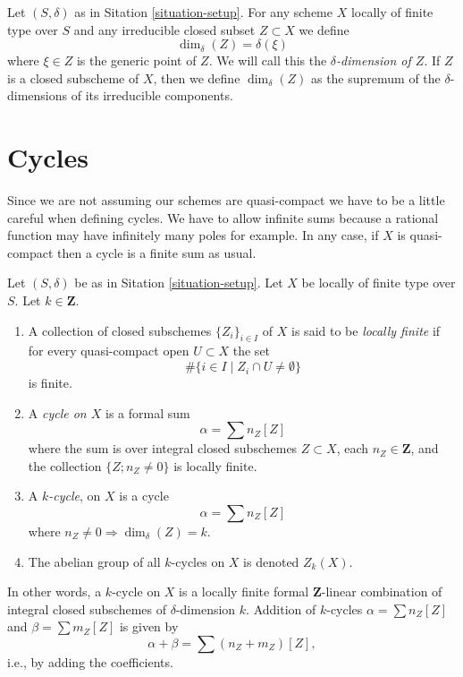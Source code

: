 \begin{definition}
\label{definition-delta-dimension}
Let $(S, \delta)$ as in Sitation \ref{situation-setup}.
For any scheme $X$ locally of finite type over $S$
and any irreducible closed subset $Z \subset X$ we define
$$
\dim_\delta(Z) = \delta(\xi)
$$
where $\xi \in Z$ is the generic point of $Z$.
We will call this the {\it $\delta$-dimension of $Z$}.
If $Z$ is a closed subscheme of $X$, then we define
$\dim_\delta(Z)$ as the supremum of the $\delta$-dimensions
of its irreducible components.
\end{definition}







\section{Cycles}
\label{section-cycles}

\noindent
Since we are not assuming our schemes are quasi-compact we have
to be a little careful when defining cycles. We have to allow
infinite sums because a rational function may have infinitely many
poles for example. In any case, if $X$ is quasi-compact then a
cycle is a finite sum as usual.

\begin{definition}
\label{definition-cycles}
Let $(S, \delta)$ be as in Sitation \ref{situation-setup}.
Let $X$ be locally of finite type over $S$.
Let $k \in \mathbf{Z}$.
\begin{enumerate}
\item A collection of closed subschemes $\{Z_i\}_{i \in I}$ of $X$
is said to be {\it locally finite} if for every quasi-compact open
$U \subset X$ the set
$$
\# \{i\in I \mid Z_i \cap U \not = \emptyset\}
$$
is finite.
\item A {\it cycle on $X$} is a formal sum
$$
\alpha = \sum n_Z [Z]
$$
where the sum is over integral closed subschemes $Z \subset X$,
each $n_Z \in \mathbf{Z}$, and the collection
$\{Z; n_Z \not = 0\}$ is locally finite.
\item A {\it $k$-cycle}, on $X$ is
a cycle
$$
\alpha = \sum n_Z [Z]
$$
where $n_Z \not = 0 \Rightarrow \dim_\delta(Z) = k$.
\item The abelian group of all $k$-cycles on $X$ is denoted $Z_k(X)$.
\end{enumerate}
\end{definition}

\noindent
In other words, a $k$-cycle on $X$
is a locally finite formal $\mathbf{Z}$-linear
combination of integral closed subschemes of $\delta$-dimension $k$.
Addition of $k$-cycles $\alpha = \sum n_Z[Z]$ and 
$\beta = \sum m_Z[Z]$ is given by
$$
\alpha + \beta = \sum (n_Z + m_Z)[Z],
$$
i.e., by adding the coefficients.




